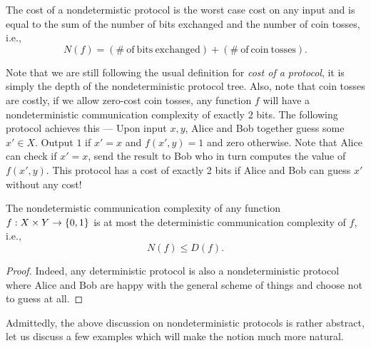 \documentclass[usletter]{article}
\providecommand\cbrac[1]{\ensuremath \left\{#1\right\}}
\newcommand{\X}{X}
\newcommand{\Y}{Y}
\newcommand{\df}{D(f)}
\newcommand{\nf}{N(f)}
\begin{document}
\begin{definition}
\label{def:nondet_cost}
The cost of a nondetermistic protocol is the worst case cost on any input and is equal to the sum of the number of bits exchanged and the number of coin tosses, i.e.,
$$
\nf = (\mathrm{\#\ of\ bits\ exchanged}) + (\mathrm{\#\ of\ coin\ tosses}).
$$
\end{definition}
\begin{remark}
Note that we are still following the usual definition for \emph{cost of a protocol}, it is simply the depth of the nondeterministic protocol tree. Also, note that coin tosses are costly, if we allow zero-cost coin tosses, any function $f$ will have a nondeterministic communication complexity of exactly $2$ bits. The following protocol achieves this --- Upon input $x, y$, Alice and Bob together guess some $x' \in \X$. Output $1$ if $x' = x$ and $f(x', y) = 1$ and zero otherwise. Note that Alice can check if $x' = x$, send the result to Bob who in turn computes the value of $f(x', y)$. This protocol has a cost of exactly 2 bits if Alice and Bob can guess $x'$ without any cost!
\end{remark}

\begin{proposition}
The nondetermistic communication complexity of any function $f : \X \times \Y \to \cbrac{0,1}$ is at most the deterministic communication complexity of $f$, i.e.,
$$
\nf \leq \df.
$$
\end{proposition}
\begin{proof}
Indeed, any deterministic protocol is also a nondeterministic protocol where Alice and Bob are happy with the general scheme of things and choose not to guess at all.
\end{proof}

Admittedly, the above discussion on nondeterministic protocols is rather abstract, let us discuss a few examples which will make the notion much more natural.
\end{document}
